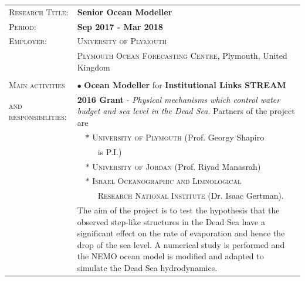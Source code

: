 \documentclass[a4paper, oneside, final]{scrartcl}
\newcommand{\gray}{\rowcolor[gray]{.90}} %
\begin{document}
\begin{tabularx}{0.97\linewidth}{>{\raggedright\scshape}p{4.4cm}|X}
\gray \textsc{Research Title:}  & \textbf{Senior Ocean Modeller}\\
\gray \textsc{Period:}          & \textbf{Sep 2017 - Mar 2018}\\
\textsc{Employer:}        & \textsc{University of Plymouth} \\
                          & \textsc{Plymouth Ocean Forecasting Centre}, Plymouth, United Kingdom\\
                                & \\
\textsc{Main activities}        & $\bullet$  \textbf{Ocean Modeller} for \textbf{Institutional Links STREAM} \\
\textsc{and responsibilities:}  & \textbf{2016 Grant} - \textit{Physical mechanisms which control water budget and sea level in the Dead Sea}. Partners of the project are \\
                                 & \ \ $\ast$ \textsc{University of Plymouth} (Prof. Georgy Shapiro \\
                                 & \ \ \ \ \ is P.I.) \\ 
                                 & \ \ $\ast$ \textsc{University of Jordan} (Prof. Riyad Manasrah) \\
                                 & \ \ $\ast$ \textsc{Israel Oceanographic and Limnological} \\
                                 & \ \ \ \ \ \textsc{Research National Institute} (Dr. Isaac Gertman). \\
                                 & The aim of the project is to test the hypothesis that the observed step-like structures in the Dead Sea have a significant effect on the rate of evaporation and hence the drop of the sea level. A numerical study is performed and the NEMO ocean model is modified and adapted to simulate the Dead Sea hydrodynamics. \\
\end{tabularx}
\end{document}
